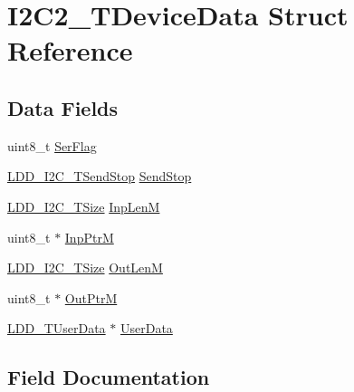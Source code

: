 \hypertarget{struct_i2_c2___t_device_data}{}\section{I2\+C2\+\_\+\+T\+Device\+Data Struct Reference}
\label{struct_i2_c2___t_device_data}
\subsection*{Data Fields}
\begin{DoxyCompactItemize}
\item 
uint8\+\_\+t \hyperlink{struct_i2_c2___t_device_data_a3b9f8fe483df17865eec4a4dbae68f94}{Ser\+Flag}
\item 
\hyperlink{group___p_e___types__module_gacac4ade6fbcd28c9ddcd864242063ec8}{L\+D\+D\+\_\+\+I2\+C\+\_\+\+T\+Send\+Stop} \hyperlink{struct_i2_c2___t_device_data_a705c64ec9ec5e98d3f395fabbb776b41}{Send\+Stop}
\item 
\hyperlink{group___p_e___types__module_gaa7fd2bc3f1f93e051058f9e70349c2b9}{L\+D\+D\+\_\+\+I2\+C\+\_\+\+T\+Size} \hyperlink{struct_i2_c2___t_device_data_a0d4a4a96529d8d3be46d6e8f013b3c58}{Inp\+LenM}
\item 
uint8\+\_\+t $\ast$ \hyperlink{struct_i2_c2___t_device_data_aec7b2275086547cd6a0f0e3000de2b01}{Inp\+PtrM}
\item 
\hyperlink{group___p_e___types__module_gaa7fd2bc3f1f93e051058f9e70349c2b9}{L\+D\+D\+\_\+\+I2\+C\+\_\+\+T\+Size} \hyperlink{struct_i2_c2___t_device_data_a064426c48cafd0c15962acdf0d76793f}{Out\+LenM}
\item 
uint8\+\_\+t $\ast$ \hyperlink{struct_i2_c2___t_device_data_af8d434e5670125554b6859d0aca9de41}{Out\+PtrM}
\item 
\hyperlink{group___p_e___types__module_ga0b66a73f87238a782318aa0be7578e35}{L\+D\+D\+\_\+\+T\+User\+Data} $\ast$ \hyperlink{struct_i2_c2___t_device_data_a849d3e0bc02b5dc79ba5b17a03bd2a28}{User\+Data}
\end{DoxyCompactItemize}


\subsection{Field Documentation}
\mbox{\label{struct_i2_c2___t_device_data_a0d4a4a96529d8d3be46d6e8f013b3c58}} 
